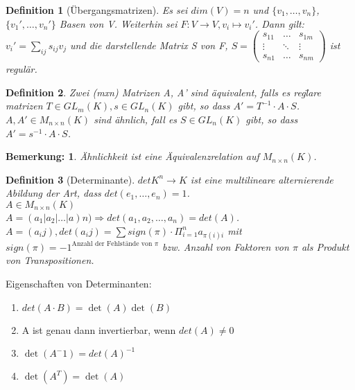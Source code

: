 \documentclass{report}
\theoremstyle{customrem}
\newtheorem*{bemerkung}{Bemerkung\textnormal:}
\theoremstyle{customdef}
\newtheorem{definition}{Definition}[chapter]
\theoremstyle{customenv}
\begin{document}
\begin{definition}[\"Ubergangsmatrizen]
  Es sei \(dim(V) = n\) und \(\{v_1, \dots, v_n\}\),  \(\{v_1', \dots, v_n'\}\)
  Basen von V. Weiterhin sei \(F: V \to V, v_i \mapsto v_i'\). Dann gilt:\\
  \(v_i' = \sum_{ij} s_{ij} v_j\) und die darstellende Matrix S von F, 
  \(
  S = \begin{pmatrix}
    s_{11} & \dots  & s_{1m}\\
    \vdots & \ddots & \vdots\\
    s_{n1} & \dots  & s_{nm}
  \end{pmatrix}
  \)
  ist regul\"ar.
\end{definition}


\begin{definition}
  Zwei (mxn) Matrizen A, A' sind \"aquivalent, falls es reg\"lare matrizen \(T
  \in GL_m(K), s \in GL_n(K)\) gibt, so dass \(A' = T^{-1} \cdot A \cdot S\).\\
  \(A, A' \in M_{n \times n}(K)\)  sind \"ahnlich, fall es \(S \in GL_n(K)\)
  gibt, so dass \(A' = s^{-1} \cdot A \cdot S\).
\end{definition}

\begin{bemerkung}
  \"Ahnlichkeit ist eine \"Aquivalenzrelation auf \(M_{n \times n}(K)\).
\end{bemerkung}


\begin{definition}[Determinante]
  \(det K^n \to K\) ist eine multilineare alternierende  Abildung der Art,
  dass \(det(e_1, \dots, e_n) = 1\).\\
  \(A \in M_{n \times n}(K)\)\\
  \(A = (a_1 | a_2 | \dots | a)n) \Rightarrow det(a_1, a_2, \dots, a_n) = det(A)\).\\
  \(A = (a_ij), det(a_ij) = \sum sign(\pi) \cdot \Pi_{i=1}^n a_{\pi(i)i}\) mit
  \(sign(\pi) = -1^{\text{Anzahl der Fehlst\"ande von }\pi}\) bzw. Anzahl von
  Faktoren von \(\pi\) als Produkt von Transpositionen.
\end{definition}

Eigenschaften von Determinanten:\\
\begin{enumerate}
  \item{\(det(A \cdot B) = \det(A) \det(B)\)\\}
  \item{A ist genau dann invertierbar, wenn \(det(A) \neq 0\)\\}
  \item{\(\det(A^-1) = det(A)^{-1}\)}
  \item{\(\det(A^T) = \det(A)\)}
\end{enumerate}
\end{document}
